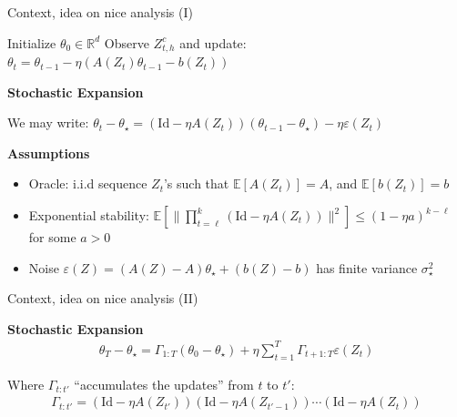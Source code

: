\documentclass[aspectratio=169,14pt]{beamer}
\begin{document}
\begin{frame}{Context, idea on nice analysis (I) }
  
  {\tiny
    \begin{algorithmic}
      \State Initialize $\theta_0 \in \mathbb{R}^d$
      \State Observe $Z^c_{t,h}$ and update: $\theta_{t} = \theta_{t-1} - \eta( A(Z_{t}) \theta_{t-1} - b(Z_{t}))$
      \EndFor
    \end{algorithmic}
  }

  \pause
  \vspace{-0.5em}
  
  \textbf{Stochastic Expansion}

  \vspace{-0.5em}

  We may write: $\theta_{t} - \theta_\star = (\text{Id} - \eta A(Z_t))(\theta_{t-1} - \theta_\star) - \eta \varepsilon(Z_t)$  

  \pause
  
  \textbf{Assumptions}

  \vspace{-0.5em}
  
  \begin{itemize}\setlength{\itemindent}{-1em}
    \small
  \item Oracle: i.i.d sequence $Z_{t}$'s such that
    $\mathbb{E} [A(Z_{t})] = A$, and
    $\mathbb{E} [b(Z_{t})] = b$
    
  \item Exponential stability: $\mathbb{E}[ \| \prod_{t=\ell}^k (\text{Id} - \eta A(Z_t)) \|^2 ] \le (1 - \eta a)^{k-\ell}$ for some $a > 0$

  \item Noise $\varepsilon(Z) = (A(Z) - A) \theta_\star + (b(Z) - b)$ has finite variance $\sigma_\star^2$
  \end{itemize}

  \vspace{1em}


\end{frame}


\begin{frame}[t]{Context, idea on nice analysis (II) }

  \textbf{Stochastic Expansion}
  \begin{align*}
    \theta_T - \theta_\star
    =
    \Gamma_{1:T} (\theta_0 - \theta_\star) + \eta \sum_{t=1}^T \Gamma_{t+1:T} \varepsilon(Z_t)
  \end{align*}

  Where $\Gamma_{t:t'}$ ``accumulates the updates'' from $t$ to $t'$:
  \begin{align*}
    \Gamma_{t:t'} = (\text{Id} - \eta A(Z_{t'})) (\text{Id} - \eta A(Z_{t'-1})) \cdots (\text{Id} - \eta A(Z_t))
  \end{align*}

  \vspace{1em}


\end{frame}
\end{document}
